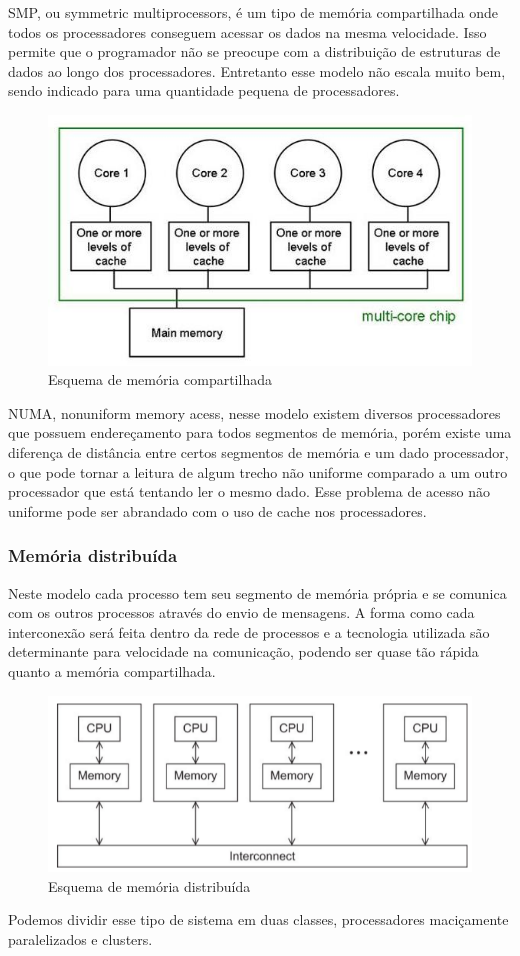 \documentclass[a4paper]{article}
\begin{document}
SMP, ou symmetric multiprocessors, é um tipo de memória compartilhada onde todos os processadores conseguem acessar os dados na mesma velocidade. Isso permite que o programador não se preocupe com a distribuição de estruturas de dados ao longo dos processadores. Entretanto esse modelo não escala muito bem, sendo indicado para uma quantidade pequena de processadores.

\begin{figure}[h]
\centering
\includegraphics[scale=0.6]{memcomp}
\caption{Esquema de memória compartilhada}
\end{figure}

NUMA, nonuniform memory acess, nesse modelo existem diversos processadores que possuem endereçamento para todos segmentos de memória, porém existe uma diferença de distância entre certos segmentos de memória e um dado processador, o que pode tornar a leitura de algum trecho não uniforme comparado a um outro processador que está tentando ler o mesmo dado. Esse problema de acesso não uniforme pode ser abrandado com o uso de cache nos processadores.


\subsubsection{Memória distribuída}

Neste modelo cada processo tem seu segmento de memória própria e se comunica com os outros processos através do envio de mensagens. A forma como cada interconexão será feita dentro da rede de processos e a tecnologia utilizada são determinante para velocidade na comunicação, podendo ser quase tão rápida quanto a memória compartilhada.
\begin{figure}[h]
\centering
\includegraphics[scale=0.5]{memdist}
\caption{Esquema de memória distribuída}
\end{figure}
Podemos dividir esse tipo de sistema em duas classes, processadores maciçamente paralelizados e clusters. 
\end{document}
